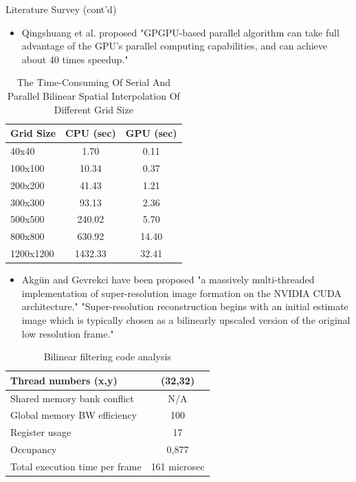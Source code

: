 \documentclass{beamer}
\begin{document}
	\begin{frame}{Literature Survey (cont'd)}
		\begin{itemize}
			\item\justifying Qingshuang et al.\cite{qingshuang2013parallel} proposed "GPGPU-based parallel algorithm can take full advantage of the GPU's parallel computing capabilities, and can achieve about 40 times speedup."
		\end{itemize}
		\begin{table}[H] %
			\centering	
			\caption[The Time-Consuming Of Serial And Parallel Bilinear Spatial Interpolation Of Different Grid Size]{\justifying The Time-Consuming Of Serial And Parallel Bilinear Spatial Interpolation Of Different Grid Size \cite{qingshuang2013parallel}}
			\label{tab:table_1}
			\begin{tabular}{l c c }
				Grid Size & CPU (sec) & GPU (sec)\\ \hline\hline 
				40x40 & 1.70 & 0.11 \\  \hline
				100x100 & 10.34 & 0.37 \\ \hline
				200x200 & 41.43 & 1.21 \\ \hline
				300x300 & 93.13 & 2.36 \\ \hline
				500x500 & 240.02 & 5.70 \\ \hline
				800x800 & 630.92 & 14.40 \\ \hline
				1200x1200 & 1432.33 &  32.41 \\ \hline
			\end{tabular}
		\end{table}
	\end{frame}
	\begin{frame}
		\begin{itemize}
			\item\justifying Akgün and Gevrekci have been proposed "a massively multi-threaded implementation of super-resolution image formation on the NVIDIA CUDA architecture." \cite{akgun2013accelerating} "Super-resolution reconstruction begins with an initial estimate image which is typically chosen as a bilinearly upscaled version of the original low resolution frame."
		\end{itemize}
		\begin{table}[H] %
			\centering	
			\caption[Bilinear filtering code analysis]{Bilinear filtering code analysis \cite{akgun2013accelerating}}
			\label{tab:table_2}
			\begin{tabular}{l c}
			    \hline\hline
				Thread numbers (x,y) &(32,32) \\ \hline 
				Shared memory bank conflict & N/A \\ \hline
				Global memory BW efficiency & 100 \\ \hline
				Register usage & 17 \\ \hline
				Occupancy & 0,877 \\ \hline
				Total execution time per frame & 161 microsec\\ \hline
			\end{tabular}
		\end{table}
	\end{frame}
\end{document}
